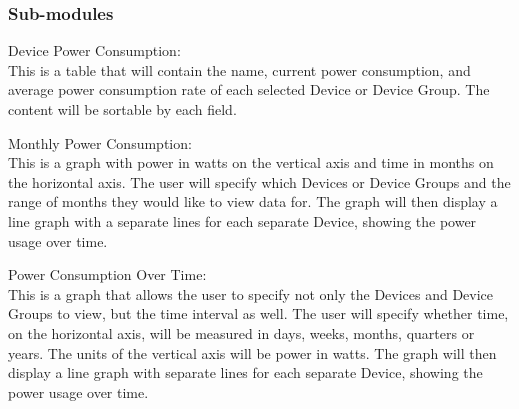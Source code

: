 \subsubsection{Sub-modules}
Device Power Consumption: \\
This is a table that will contain the name, current power consumption, and average power consumption rate of each selected Device or Device Group. 
The content will be sortable by each field.

Monthly Power Consumption: \\
This is a graph with power in watts on the vertical axis and time in months on the horizontal axis. 
The user will specify which Devices or Device Groups and the range of months they would like to view data for. 
The graph will then display a line graph with a separate lines for each separate Device, showing the power usage over time. 

Power Consumption Over Time: \\
This is a graph that allows the user to specify not only the Devices and Device Groups to view, but the time interval as well. 
The user will specify whether time, on the horizontal axis, will be measured in days, weeks, months, quarters or years. 
The units of the vertical axis will be power in watts. 
The graph will then display a line graph with separate lines for each separate Device, showing the power usage over time. 